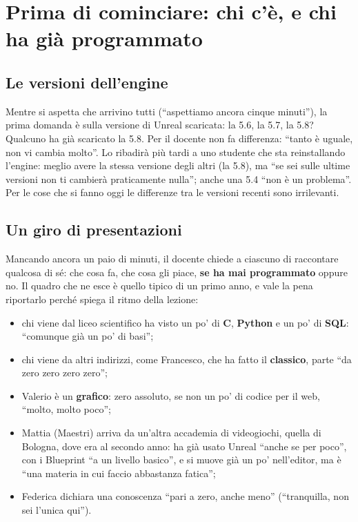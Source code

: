 \section{Prima di cominciare: chi c'è, e chi ha già programmato}
\label{gd7:sec:presentazioni}

\subsection{Le versioni dell'engine}

Mentre si aspetta che arrivino tutti (``aspettiamo ancora cinque minuti''),
la prima domanda è sulla versione di Unreal scaricata: la 5.6, la 5.7, la
5.8? Qualcuno ha già scaricato la 5.8. Per il docente non fa differenza:
``tanto è uguale, non vi cambia molto''. Lo ribadirà più tardi a uno studente
che sta reinstallando l'engine: meglio avere la stessa versione degli altri
(la 5.8), ma ``se sei sulle ultime versioni non ti cambierà praticamente
nulla''; anche una 5.4 ``non è un problema''. Per le cose che si fanno oggi
le differenze tra le versioni recenti sono irrilevanti.

\subsection{Un giro di presentazioni}

Mancando ancora un paio di minuti, il docente chiede a ciascuno di
raccontare qualcosa di sé: che cosa fa, che cosa gli piace, \textbf{se ha mai
programmato} oppure no. Il quadro che ne esce è quello tipico di un primo
anno, e vale la pena riportarlo perché spiega il ritmo della lezione:
\begin{itemize}
  \item chi viene dal liceo scientifico ha visto un po' di \textbf{C},
        \textbf{Python} e un po' di \textbf{SQL}: ``comunque già un po' di
        basi'';
  \item chi viene da altri indirizzi, come Francesco, che ha fatto il
        \textbf{classico}, parte ``da zero zero zero zero'';
  \item Valerio è un \textbf{grafico}: zero assoluto, se non un po' di
        codice per il web, ``molto, molto poco'';
  \item Mattia (Maestri) arriva da un'altra accademia di videogiochi, quella
        di Bologna, dove era al secondo anno: ha già usato Unreal ``anche se
        per poco'', con i Blueprint ``a un livello basico'', e si muove già
        un po' nell'editor, ma è ``una materia in cui faccio abbastanza
        fatica'';
  \item Federica dichiara una conoscenza ``pari a zero, anche meno''
        (``tranquilla, non sei l'unica qui'').
\end{itemize}

